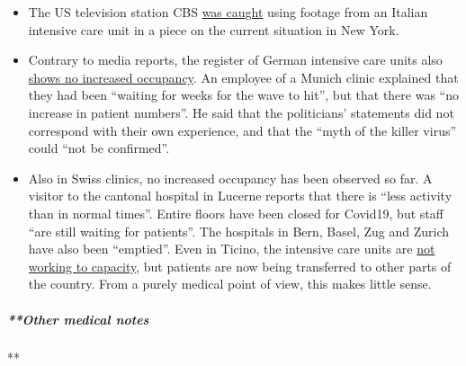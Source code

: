 \begin{itemize}
\tightlist
\item
  The US television station CBS
  \href{https://nypost.com/2020/04/01/cbs-admits-to-using-footage-from-italy-in-report-about-nyc/}{was
  caught} using footage from an Italian intensive care unit in a piece
  on the current situation in New York.
\item
  Contrary to media reports, the register of German intensive care units
  also \href{https://www.divi.de/register/intensivregister}{shows no
  increased occupancy}. An employee of a Munich clinic explained that
  they had been ``waiting for weeks for the wave to hit'', but that
  there was ``no increase in patient numbers''. He said that the
  politicians' statements did not correspond with their own experience,
  and that the ``myth of the killer virus'' could ``not be confirmed''.
\item
  Also in Swiss clinics, no increased occupancy has been observed so
  far. A visitor to the cantonal hospital in Lucerne reports that there
  is ``less activity than in normal times''. Entire floors have been
  closed for Covid19, but staff ``are still waiting for patients''. The
  hospitals in Bern, Basel, Zug and Zurich have also been ``emptied''.
  Even in Ticino, the intensive care units are
  \href{https://www.nzz.ch/schweiz/tessin-verlegt-erste-corona-patienten-in-deutschschweizer-spitaeler-ld.1549417}{not
  working to capacity}, but patients are now being transferred to other
  parts of the country. From a purely medical point of view, this makes
  little sense.
\end{itemize}

\hypertarget{other-medical-notes}{%
\subparagraph{**Other medical notes}\label{other-medical-notes}}

**

